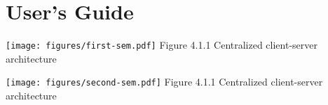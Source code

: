 \chapter{User's Guide}

\begin{center}
    \texttt{[image: figures/first-sem.pdf]}
    Figure 4.1.1 Centralized client-server architecture
\end{center}

\begin{center}
    \texttt{[image: figures/second-sem.pdf]}
    Figure 4.1.1 Centralized client-server architecture
\end{center}

